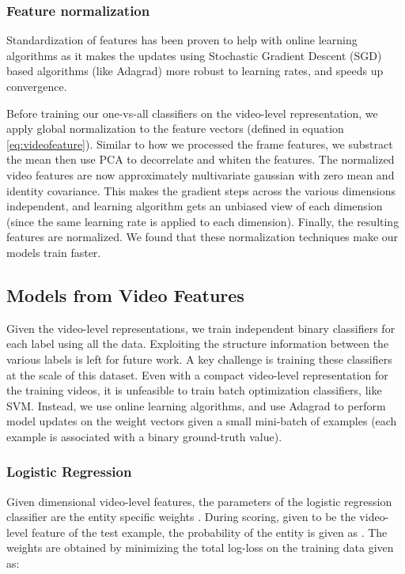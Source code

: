 \documentclass{sig-alternate-05-2015}
\begin{document}
 

\subsubsection{Feature normalization}
\label{sec:normalization}
Standardization of features has been proven to help with online learning
algorithms\cite{inception-bn,mean_normalized_sgd} as it makes the updates using
Stochastic Gradient Descent (SGD) based algorithms (like Adagrad) more robust to
learning rates, and speeds up convergence.

Before training our one-vs-all classifiers on the video-level representation, we
apply global normalization to the feature vectors 
(defined in equation \ref{eq:videofeature}). Similar to how we processed the frame features,
we substract the mean  then use PCA to decorrelate and whiten the features.
The normalized video features are now approximately multivariate gaussian with zero mean
and identity covariance. This makes the gradient steps across the various dimensions
independent, and learning algorithm gets an unbiased view of each dimension (since
the same learning rate is applied to each dimension). Finally, the resulting
features are  normalized. We found that these normalization techniques
make our models train faster. 

\subsection{Models from Video Features} \label{sec:binarymodels}
Given the video-level representations, we train independent binary classifiers
for each label using all the data. Exploiting the structure information between
the various labels is left for future work. A key challenge is training
these classifiers at the scale of this dataset. Even with a compact video-level
representation for the  training videos, it is unfeasible to train batch
optimization classifiers, like SVM. Instead, we use online learning algorithms,
and use Adagrad to perform model updates on the weight vectors given a small
mini-batch of examples (each example is associated with a binary ground-truth value).

\subsubsection{Logistic Regression}
Given  dimensional video-level features, the parameters  of the logistic regression classifier are the entity specific weights . During scoring, given  to be the video-level feature of the test example, the probability of the entity  is given as . The weights  are obtained by minimizing the total log-loss on the training data given as:
\end{document}
